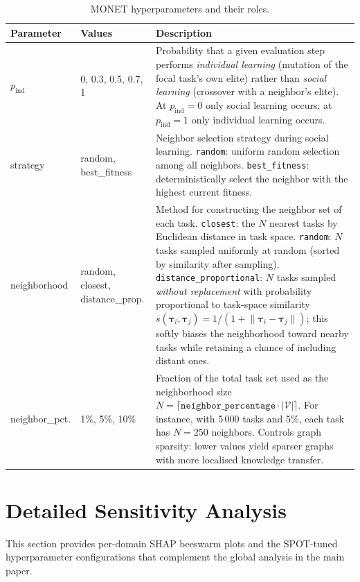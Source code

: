 \documentclass[11pt,a4paper]{article}
\begin{document}
\begin{table}[H]
\centering
\caption{MONET hyperparameters and their roles.}
\label{tab:monet-hyperparams}
\renewcommand{\arraystretch}{1.3}
\small
\begin{tabular}{@{}p{2.6cm}p{2.2cm}p{9.4cm}@{}}
\toprule
\textbf{Parameter} & \textbf{Values} & \textbf{Description} \\
\midrule
$p_\text{ind}$ &
0, 0.3, 0.5, 0.7, 1 &
Probability that a given evaluation step performs
\emph{individual learning} (mutation of the focal task's own elite)
rather than \emph{social learning} (crossover with a neighbor's
elite). At $p_\text{ind}=0$ only social learning occurs; at
$p_\text{ind}=1$ only individual learning occurs. \\
\addlinespace
strategy &
random, best\_fitness &
Neighbor selection strategy during social learning.
\texttt{random}: uniform random selection among all neighbors.
\texttt{best\_fitness}: deterministically select the neighbor with
the highest current fitness. \\
\addlinespace
neighborhood &
random, closest, distance\_prop. &
Method for constructing the neighbor set of each task.
\texttt{closest}: the $N$ nearest tasks by Euclidean distance in task
space.
\texttt{random}: $N$ tasks sampled uniformly at random (sorted by
similarity after sampling).
\texttt{distance\_proportional}: $N$ tasks sampled \emph{without
replacement} with probability proportional to task-space similarity
$s(\boldsymbol{\tau}_i, \boldsymbol{\tau}_j) =
  1/(1 + \lVert \boldsymbol{\tau}_i - \boldsymbol{\tau}_j \rVert)$;
this softly biases the neighborhood toward nearby tasks while
retaining a chance of including distant ones. \\
\addlinespace
neighbor\_pct. &
1\%, 5\%, 10\% &
Fraction of the total task set used as the neighborhood size
$N = \lceil \texttt{neighbor\_percentage} \cdot |\mathcal{V}| \rceil$.
For instance, with 5\,000 tasks and 5\%, each task has $N=250$
neighbors. Controls graph sparsity: lower values yield sparser graphs
with more localised knowledge transfer. \\
\bottomrule
\end{tabular}
\end{table}

\section{Detailed Sensitivity Analysis}\label{sec:sensitivity}

This section provides per-domain SHAP beeswarm plots and the
SPOT-tuned hyperparameter configurations that complement the global
analysis in the main paper.
\end{document}
